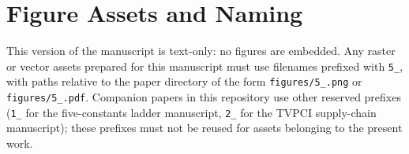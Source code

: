 \documentclass[12pt]{article}
\begin{document}
\appendix
\section{Figure Assets and Naming}\label{app:figures}

This version of the manuscript is text-only: no figures are embedded.  Any raster or
vector assets prepared for this manuscript must use filenames prefixed with
\texttt{5\_}, with paths relative to the paper directory of the form
\texttt{figures/5\_<descriptive-name>.png} or \texttt{figures/5\_<descriptive-name>.pdf}.
Companion papers in this repository use other reserved prefixes (\texttt{1\_} for the
five-constants ladder manuscript, \texttt{2\_} for the TVPCI supply-chain manuscript);
these prefixes must not be reused for assets belonging to the present work.



\end{document}
